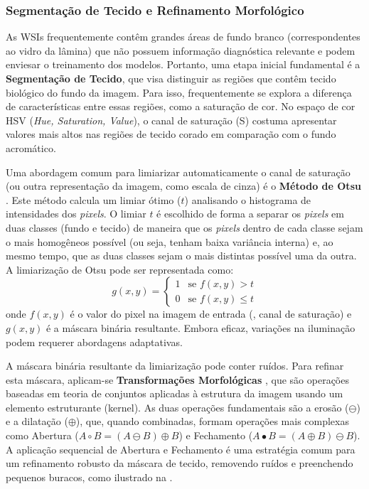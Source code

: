 \subsubsection{Segmentação de Tecido e Refinamento Morfológico}\label{subsubsec:fund_segmentacao_tecido}

As WSIs frequentemente contêm grandes áreas de fundo branco (correspondentes ao vidro da lâmina) que não possuem informação diagnóstica relevante e podem enviesar o treinamento dos modelos. Portanto, uma etapa inicial fundamental é a \textbf{Segmentação de Tecido}, que visa distinguir as regiões que contêm tecido biológico do fundo da imagem. Para isso, frequentemente se explora a diferença de características entre essas regiões, como a saturação de cor. No espaço de cor HSV (\textit{Hue, Saturation, Value}), o canal de saturação (S) costuma apresentar valores mais altos nas regiões de tecido corado em comparação com o fundo acromático.

Uma abordagem comum para limiarizar automaticamente o canal de saturação (ou outra representação da imagem, como escala de cinza) é o \textbf{Método de Otsu} \cite{Otsu1979}. Este método calcula um limiar ótimo ($t$) analisando o histograma de intensidades dos \textit{pixels}. O limiar $t$ é escolhido de forma a separar os \textit{pixels} em duas classes (fundo e tecido) de maneira que os \textit{pixels} dentro de cada classe sejam o mais homogêneos possível (ou seja, tenham baixa variância interna) e, ao mesmo tempo, que as duas classes sejam o mais distintas possível uma da outra. A limiarização de Otsu pode ser representada como:
\begin{equation}\label{eq:otsu_threshold}
    g(x,y) = \begin{cases} 
      1 & \text{se } f(x,y) > t \\
      0 & \text{se } f(x,y) \leq t 
   \end{cases}
\end{equation}
onde $f(x,y)$ é o valor do pixel na imagem de entrada (\eg, canal de saturação) e $g(x,y)$ é a máscara binária resultante. Embora eficaz, variações na iluminação podem requerer abordagens adaptativas.

A máscara binária resultante da limiarização pode conter ruídos. Para refinar esta máscara, aplicam-se \textbf{Transformações Morfológicas} \cite{Gonzalez2006}, que são operações baseadas em teoria de conjuntos aplicadas à estrutura da imagem usando um elemento estruturante (kernel). As duas operações fundamentais são a erosão ($\ominus$) e a dilatação ($\oplus$), que, quando combinadas, formam operações mais complexas como Abertura ($A \circ B = (A \ominus B) \oplus B$) e Fechamento ($A \bullet B = (A \oplus B) \ominus B$). A aplicação sequencial de Abertura e Fechamento é uma estratégia comum para um refinamento robusto da máscara de tecido, removendo ruídos e preenchendo pequenos buracos, como ilustrado na .

